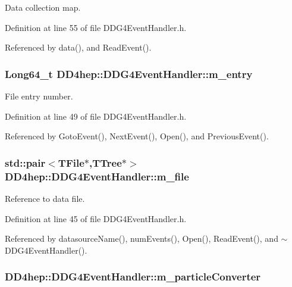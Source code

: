 Data collection map. 

Definition at line 55 of file DDG4EventHandler.h.

Referenced by data(), and ReadEvent().\hypertarget{class_d_d4hep_1_1_d_d_g4_event_handler_ab28e33c8789d149c104fea42e39ba060}{
\subsubsection[{m\_\-entry}]{\setlength{\rightskip}{0pt plus 5cm}Long64\_\-t {\bf DD4hep::DDG4EventHandler::m\_\-entry}}}
\label{class_d_d4hep_1_1_d_d_g4_event_handler_ab28e33c8789d149c104fea42e39ba060}


File entry number. 

Definition at line 49 of file DDG4EventHandler.h.

Referenced by GotoEvent(), NextEvent(), Open(), and PreviousEvent().\hypertarget{class_d_d4hep_1_1_d_d_g4_event_handler_a0b53d1d20cca9b02b9f119c99832b503}{
\subsubsection[{m\_\-file}]{\setlength{\rightskip}{0pt plus 5cm}std::pair$<$TFile$\ast$,TTree$\ast$$>$ {\bf DD4hep::DDG4EventHandler::m\_\-file}}}
\label{class_d_d4hep_1_1_d_d_g4_event_handler_a0b53d1d20cca9b02b9f119c99832b503}


Reference to data file. 

Definition at line 45 of file DDG4EventHandler.h.

Referenced by datasourceName(), numEvents(), Open(), ReadEvent(), and $\sim$DDG4EventHandler().\hypertarget{class_d_d4hep_1_1_d_d_g4_event_handler_abf82ae01b8dc3e3cfc84de48f42d4ce2}{
\subsubsection[{m\_\-particleConverter}]{ {\bf DD4hep::DDG4EventHandler::m\_\-particleConverter}}}
\label{class_d_d4hep_1_1_d_d_g4_event_handler_abf82ae01b8dc3e3cfc84de48f42d4ce2}


